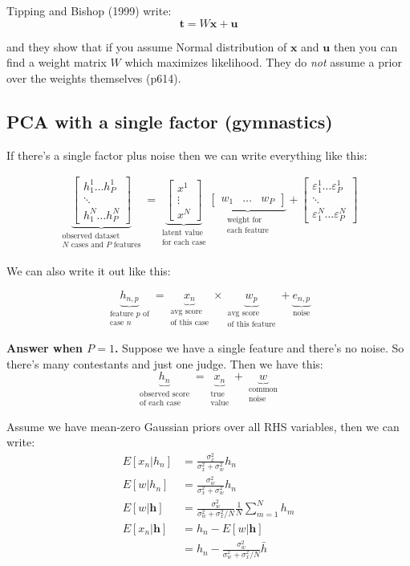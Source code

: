 \documentclass[
  10pt,
  letterpaper,
  DIV=11,
  numbers=noendperiod,
  oneside]{scrartcl}
\newcommand{\bm}[1]{\boldsymbol{#1}}
\newcommand{\ut}[2]{\underbrace{#1}_{\text{#2}}}
\newcommand{\utt}[3]{\underbrace{#1}_{\substack{\text{#2}\\\text{#3}}}}
\begin{document}
Tipping and Bishop (1999) write: \[\bm{t}=W\bm{x}+\bm{u}\]

and they show that if you assume Normal distribution of \(\bm{x}\) and
\(\bm{u}\) then you can find a weight matrix \(W\) which maximizes
likelihood. They do \emph{not} assume a prior over the weights
themselves (p614).

\subsection{PCA with a single factor
(gymnastics)}\label{pca-with-a-single-factor-gymnastics}

If there's a single factor plus noise then we can write everything like
this:

\[\begin{aligned}
      \utt{\begin{bmatrix}h_1^1  \ldots h_P^1 \\ \ddots \\ h_1^N \ldots h_P^N\end{bmatrix}}{observed dataset}{$N$ cases and $P$ features}
         = \utt{\begin{bmatrix}x^1  \\ \vdots \\ x^N \end{bmatrix}}{latent value}{for each case}
            \utt{\begin{bmatrix}w_1  & \ldots & w_P \end{bmatrix}}{weight for}{each feature}
   + \begin{bmatrix}\varepsilon_1^1  \ldots \varepsilon_P^1 \\ \ddots \\
       \varepsilon_1^N \ldots \varepsilon_P^N\end{bmatrix}
\end{aligned}
\]

We can also write it out like this:

\[\utt{h_{n,p}}{feature $p$ of}{case $n$} = \utt{x_n}{avg score}{of this case} \times \utt{w_p}{avg score}{of this feature} + \ut{e_{n,p}}{noise}\]

\textbf{Answer when \(P=1\).} Suppose we have a single feature and
there's no noise. So there's many contestants and just one judge. Then
we have this:
\[\utt{h_n}{observed score}{of each case} = \utt{x_n}{true}{value} + \utt{w}{common}{noise}\]

Assume we have mean-zero Gaussian priors over all RHS variables, then we
can write: \[\begin{aligned}
   E[x_n|h_n] &= \frac{\sigma_x^2}{\sigma_x^2+\sigma_w^2}h_n \\
   E[w|h_n] &= \frac{\sigma_w^2}{\sigma_x^2+\sigma_w^2}h_n \\
   E[w|\bm{h}] &= \frac{\sigma_w^2}{\sigma_w^2+\sigma_x^2/N}\frac{1}{N}\sum_{m=1}^Nh_m \\
   E[x_n|\bm{h}] &= h_n-E[w|\bm{h}] \\
      &= h_n-\frac{\sigma_w^2}{\sigma_w^2+\sigma_x^2/N}\bar{h} \\
\end{aligned}
\]
\end{document}
